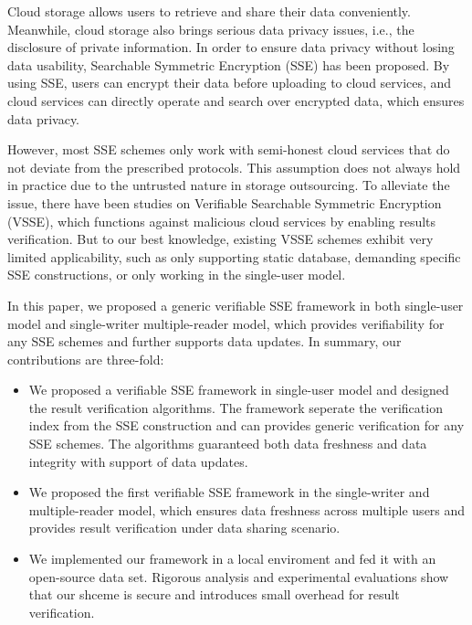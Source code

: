 \begin{eabstract}
  Cloud storage allows users to retrieve and share their data conveniently. %
  Meanwhile, cloud storage also brings serious data privacy issues, i.e., the disclosure of private information. In order to ensure data privacy without losing data usability,
  Searchable Symmetric Encryption (SSE) has been proposed. By using SSE, users can encrypt their data before uploading to cloud services, and cloud services can directly operate and search over encrypted data, which ensures data privacy.

  However, most SSE schemes only work with semi-honest cloud services that do not deviate from the prescribed protocols. This assumption does not always hold in practice due to the untrusted nature in storage outsourcing. To alleviate the issue, there have been studies on Verifiable Searchable Symmetric Encryption (VSSE), which functions against malicious cloud services by enabling results verification. But to our best knowledge, existing VSSE schemes exhibit very limited applicability, such as only supporting static database, demanding specific SSE constructions, or only working in the single-user model.

  In this paper, we proposed a generic verifiable SSE framework in both single-user model and single-writer multiple-reader model, which provides verifiability for any SSE schemes and further supports data updates. In summary, our contributions are three-fold:
  \begin{itemize}
    \item We proposed a verifiable SSE framework in single-user model and designed the result verification algorithms. The framework seperate the verification index from the SSE construction and can provides generic verification for any SSE schemes. The algorithms guaranteed both data freshness and data integrity with support of data updates.
    \item We proposed the first verifiable SSE framework in the single-writer and multiple-reader model, which ensures data freshness across multiple users and provides result verification under data sharing scenario.
    \item We implemented our framework in a local enviroment and fed it with an open-source data set. Rigorous analysis and experimental evaluations show that our shceme is secure and introduces small overhead for result verification.
  \end{itemize}
\end{eabstract}

